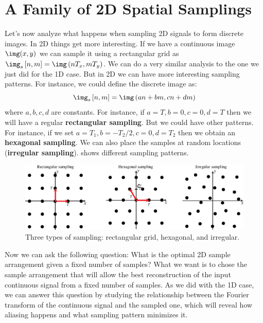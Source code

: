 

\section{A Family of 2D Spatial Samplings}

Let's now analyze what happens when sampling 2D signals to form discrete images. In 2D things get more interesting. If we have a continuous image $\img (x,y)$ we can sample it using a rectangular grid as $\img_s \left[n,m \right] = \img \left(nT_x, mT_y \right)$. We can do a very similar analysis to the one we just did for the 1D case. But in 2D we can have more interesting sampling patterns. For instance, we could define the discrete image as:
\begin{equation}
    \img_s \left[n,m \right] = \img \left( an+bm, cn+dm \right)
\end{equation}
where $a,b,c,d$ are constants. For instance, if $a=T,b=0,c=0,d=T$ then we will have a regular {\bf rectangular sampling}. But we could have other patterns. For instance,  if we set $a=T_1,b=-T_2 / 2,c=0,d=T_2$ then we obtain an {\bf hexagonal sampling}. We can also place the samples at random locations ({\bf irregular sampling}). \Fig{\ref{fig:sampling_grids}} shows different sampling patterns.

\begin{figure}
    \centerline{
        \includegraphics[width=1\linewidth]{figures/Image_processing_sampling/sampling_grids.eps}
    }
    \caption{Three types of sampling: rectangular grid, hexagonal, and irregular.}
    \label{fig:sampling_grids}
\end{figure}

Now we can ask the following question: What is the optimal 2D sample arrangement given a fixed number of samples? What we want is to chose the sample arrangement that will allow the best reconstruction of the input continuous signal from a fixed number of samples. As we did with the 1D case, we can answer this question by studying the relationship between the Fourier transform of the continuous signal and the sampled one, which will reveal how aliasing happens and what sampling pattern minimizes it.

